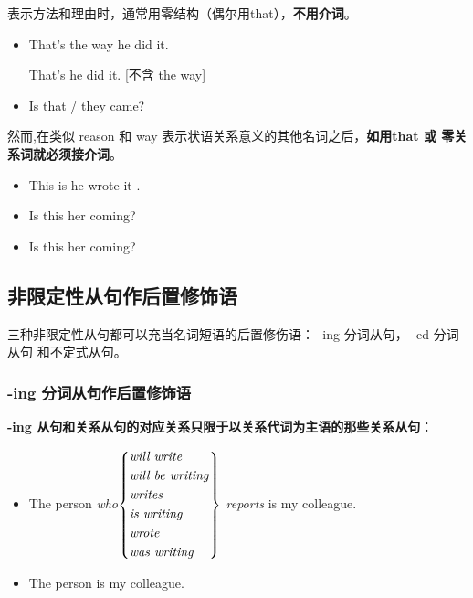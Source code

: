 表示方法和理由时，通常用零结构（偶尔用that），\textbf{不用介词}。
\begin{itemize}
\item That's the way  he did it.

  That's  he did it. [不含 the way]


\item Is that / they came?
\end{itemize}

然而,在类似 reason 和 way 表示状语关系意义的其他名词之后，\textbf{如用that 或
  零关系词就必须接介词}。
\begin{itemize}
\item This is  he wrote it .

\item Is this  her coming?
\item Is this  her coming?
\end{itemize}



\subsection{非限定性从句作后置修饰语}

三种非限定性从句都可以充当名词短语的后置修伤语： -ing 分词从句， -ed 分词从句
和不定式从句。

\subsubsection{-ing 分词从句作后置修饰语}


\textbf{-ing 从句和关系从句的对应关系只限于以关系代词为主语的那些关系从句}：
\begin{itemize}
\item The person \emph{who}$\left\{
    \begin{aligned}
      &\text{\emph{will write}} \\
      &\text{\emph{will be writing}} \\
      &\text{\emph{writes}} \\
      &\text{\emph{is writing}} \\
      &\text{\emph{wrote}} \\
      &\text{\emph{was writing}} \\
    \end{aligned}
  \right\} $ \emph{reports} is my colleague.

\item The person  is my colleague.
\end{itemize}

